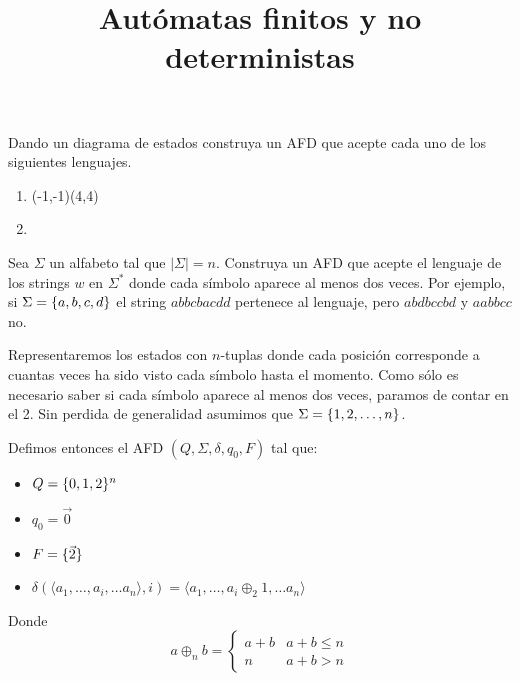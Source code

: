 \documentclass[dcc]{fcfmcourse}
\title[1]{Autómatas finitos y no deterministas}
\begin{document}
\maketitle

\begin{problems}
\problem Dando un diagrama de estados construya un AFD que acepte cada uno de los siguientes lenguajes.

\begin{enumerate}
\item {}
  \begin{solution}
    \begin{VCPicture}{(-1,-1)(4,4)}

    \end{VCPicture}
  \end{solution}
\item {}
\end{enumerate}

\problem Sea $\Sigma$ un alfabeto tal que $|\Sigma|=n$. Construya un AFD que acepte el lenguaje de los strings $w$ en $\Sigma^*$ donde cada símbolo aparece al menos dos veces. Por ejemplo, si $\Sigma=\{a,b,c,d\}$ el string $abbcbacdd$ pertenece al lenguaje, pero $abdbccbd$ y $aabbcc$ no.

\begin{solution}
  Representaremos los estados con $n$-tuplas donde cada posición corresponde a cuantas veces ha sido visto cada símbolo hasta el momento.
  Como sólo es necesario saber si cada símbolo aparece al menos dos veces, paramos de contar en el 2.
  Sin perdida de generalidad asumimos que $\Sigma = \{1,2,\ldots,n\}$.

  Defimos entonces el AFD $(Q, \Sigma, \delta, q_0, F)$ tal que:
  \begin{itemize}
    \item $Q = \{0,1,2\}^n$
    \item $q_0 = \vec{0}$
    \item $F = \{\vec{2}\}$
    \item $\delta(\langle a_1, \ldots, a_i,\ldots a_n \rangle, i) =
           \langle a_1,\ldots, a_i \oplus_2 1, \ldots a_n \rangle$
  \end{itemize}
  Donde 
  \[a \oplus_n b = 
   \begin{cases}
     a + b & a + b \leq n \\
     n & a + b > n
   \end{cases}
  \]
\end{solution}


\end{problems}
\end{document}
